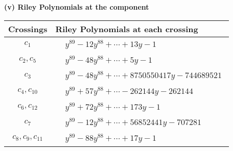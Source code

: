\documentclass[1p]{elsarticle_modified}
\theoremstyle{definition}
\begin{document}
\newpage\renewcommand{\arraystretch}{1}
\flushleft \textbf{(v) Riley Polynomials at the component}\newline \\
\begin{tabular}{m{50pt}|m{274pt}}
Crossings & \hspace{64pt}Riley Polynomials at each crossing \\
\hline $$\begin{aligned}c_{1}\end{aligned}$$&$\begin{aligned}
&y^{89}-12 y^{88}+\cdots+13 y-1
\end{aligned}$\\
\hline $$\begin{aligned}c_{2},c_{5}\end{aligned}$$&$\begin{aligned}
&y^{89}-48 y^{88}+\cdots+5 y-1
\end{aligned}$\\
\hline $$\begin{aligned}c_{3}\end{aligned}$$&$\begin{aligned}
&y^{89}-48 y^{88}+\cdots+8750550417 y-744689521
\end{aligned}$\\
\hline $$\begin{aligned}c_{4},c_{10}\end{aligned}$$&$\begin{aligned}
&y^{89}+57 y^{88}+\cdots-262144 y-262144
\end{aligned}$\\
\hline $$\begin{aligned}c_{6},c_{12}\end{aligned}$$&$\begin{aligned}
&y^{89}+72 y^{88}+\cdots+173 y-1
\end{aligned}$\\
\hline $$\begin{aligned}c_{7}\end{aligned}$$&$\begin{aligned}
&y^{89}-12 y^{88}+\cdots+56852441 y-707281
\end{aligned}$\\
\hline $$\begin{aligned}c_{8},c_{9},c_{11}\end{aligned}$$&$\begin{aligned}
&y^{89}-88 y^{88}+\cdots+17 y-1
\end{aligned}$\\
\hline
\end{tabular}\\~\\
\end{document}
